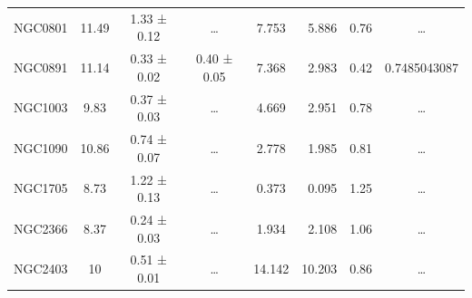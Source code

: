 \documentclass[reprint,%
 amsmath,amssymb,
 aps,
]{revtex4-1}
\begin{document}
\begin{table}[]
\begin{tabular}{cccccrrc}
\rowcolor[HTML]{F3F3F3} 
NGC0801              & 11.49                     & 1.33 ± 0.12           & …                      & 7.753                                                        & 5.886                                                          & 0.76                                                          & …                                                             \\
\rowcolor[HTML]{F3F3F3} 
NGC0891              & 11.14                     & 0.33 ± 0.02           & 0.40 ± 0.05            & 7.368                                                        & 2.983                                                          & 0.42                                                          & \multicolumn{1}{r}{\cellcolor[HTML]{F3F3F3}0.7485043087}      \\
\rowcolor[HTML]{F3F3F3} 
NGC1003              & 9.83                      & 0.37 ± 0.03           & …                      & 4.669                                                        & 2.951                                                         & 0.78                                                          & …                                                             \\
\rowcolor[HTML]{F3F3F3} 
NGC1090              & 10.86                     & 0.74 ± 0.07           & …                      & 2.778                                                        & 1.985                                                          & 0.81                                                         & …                                                             \\
\rowcolor[HTML]{F3F3F3} 
NGC1705              & 8.73                      & 1.22 ± 0.13           & …                      & 0.373                                                        & 0.095                                                       & 1.25                                                           & …                                                             \\
\rowcolor[HTML]{F3F3F3} 
NGC2366              & 8.37                      & 0.24 ± 0.03           & …                      & 1.934                                                        & 2.108                                                         & 1.06                                                           & …                                                             \\
\rowcolor[HTML]{F3F3F3} 
NGC2403              & 10                        & 0.51 ± 0.01           & …                      & 14.142                                                       & 10.203                                                          & 0.86                                                          & …                                                             \\

\end{tabular}
\end{table}
\end{document}
